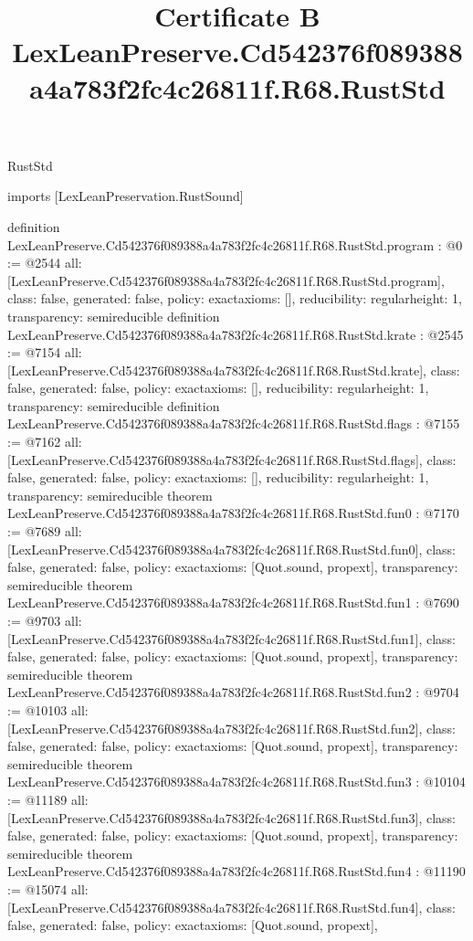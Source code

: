 \begin{lexlean}{RustStd}
\title{Certificate B LexLeanPreserve.Cd542376f089388a4a783f2fc4c26811f.R68.RustStd}
\begin{coremodule}
imports [LexLeanPreservation.RustSound]

definition LexLeanPreserve.Cd542376f089388a4a783f2fc4c26811f.R68.RustStd.program : @0 := @2544 {
  all: [LexLeanPreserve.Cd542376f089388a4a783f2fc4c26811f.R68.RustStd.program],
  class: false,
  generated: false,
  policy: exact{axioms: []},
  reducibility: regular{height: 1},
  transparency: semireducible
}
definition LexLeanPreserve.Cd542376f089388a4a783f2fc4c26811f.R68.RustStd.krate : @2545 := @7154 {
  all: [LexLeanPreserve.Cd542376f089388a4a783f2fc4c26811f.R68.RustStd.krate],
  class: false,
  generated: false,
  policy: exact{axioms: []},
  reducibility: regular{height: 1},
  transparency: semireducible
}
definition LexLeanPreserve.Cd542376f089388a4a783f2fc4c26811f.R68.RustStd.flags : @7155 := @7162 {
  all: [LexLeanPreserve.Cd542376f089388a4a783f2fc4c26811f.R68.RustStd.flags],
  class: false,
  generated: false,
  policy: exact{axioms: []},
  reducibility: regular{height: 1},
  transparency: semireducible
}
theorem LexLeanPreserve.Cd542376f089388a4a783f2fc4c26811f.R68.RustStd.fun0 : @7170 := @7689 {
  all: [LexLeanPreserve.Cd542376f089388a4a783f2fc4c26811f.R68.RustStd.fun0],
  class: false,
  generated: false,
  policy: exact{axioms: [Quot.sound, propext]},
  transparency: semireducible
}
theorem LexLeanPreserve.Cd542376f089388a4a783f2fc4c26811f.R68.RustStd.fun1 : @7690 := @9703 {
  all: [LexLeanPreserve.Cd542376f089388a4a783f2fc4c26811f.R68.RustStd.fun1],
  class: false,
  generated: false,
  policy: exact{axioms: [Quot.sound, propext]},
  transparency: semireducible
}
theorem LexLeanPreserve.Cd542376f089388a4a783f2fc4c26811f.R68.RustStd.fun2 : @9704 := @10103 {
  all: [LexLeanPreserve.Cd542376f089388a4a783f2fc4c26811f.R68.RustStd.fun2],
  class: false,
  generated: false,
  policy: exact{axioms: [Quot.sound, propext]},
  transparency: semireducible
}
theorem LexLeanPreserve.Cd542376f089388a4a783f2fc4c26811f.R68.RustStd.fun3 : @10104 := @11189 {
  all: [LexLeanPreserve.Cd542376f089388a4a783f2fc4c26811f.R68.RustStd.fun3],
  class: false,
  generated: false,
  policy: exact{axioms: [Quot.sound, propext]},
  transparency: semireducible
}
theorem LexLeanPreserve.Cd542376f089388a4a783f2fc4c26811f.R68.RustStd.fun4 : @11190 := @15074 {
  all: [LexLeanPreserve.Cd542376f089388a4a783f2fc4c26811f.R68.RustStd.fun4],
  class: false,
  generated: false,
  policy: exact{axioms: [Quot.sound, propext]},
}
\end{coremodule}
\end{lexlean}
